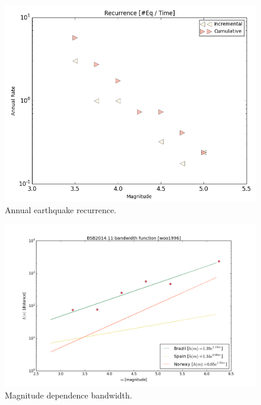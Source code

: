 \documentclass[grl]{agutex}
\begin{document}
\begin{figure}
    \includegraphics[width=.99\linewidth]{z_img_hmtk_bsb2014_11_recurrence}
    \caption{Annual earthquake recurrence.}
    \label{fig_occurrence}
\end{figure}








\begin{figure}
	\includegraphics[width=0.99\linewidth]{z_img_woo_bandwidth}
	\caption{Magnitude dependence bandwidth.}
	\label{fig_woo_bandwidth}
\end{figure}
\end{document}
